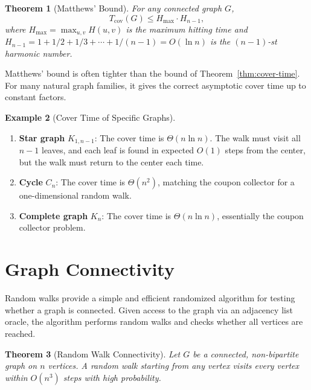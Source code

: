 \documentclass[twoside,12pt]{book}
\theoremstyle{plain}
\newtheorem{theorem}{Theorem}[chapter]
\theoremstyle{definition}
\newtheorem{example}[theorem]{Example}
\theoremstyle{remark}
\begin{document}
\begin{theorem}[Matthews' Bound]\label{thm:matthews}
For any connected graph $G$,
\[
    T_{\mathrm{cov}}(G) \leq H_{\max} \cdot H_{n-1},
\]
where $H_{\max} = \max_{u,v} H(u,v)$ is the maximum hitting time and
$H_{n-1} = 1 + 1/2 + 1/3 + \cdots + 1/(n-1) = O(\ln n)$ is the
$(n-1)$-st harmonic number.
\end{theorem}

Matthews' bound is often tighter than the bound of
Theorem~\ref{thm:cover-time}. For many natural graph families, it gives
the correct asymptotic cover time up to constant factors.

\begin{example}[Cover Time of Specific Graphs]\label{ex:cover-times}
\begin{enumerate}[label=(\roman*)]
\item \textbf{Star graph} $K_{1,n-1}$: The cover time is
    $\Theta(n \ln n)$. The walk must visit all $n-1$ leaves, and each
    leaf is found in expected $O(1)$ steps from the center, but the
    walk must return to the center each time.
\item \textbf{Cycle} $C_n$: The cover time is $\Theta(n^2)$, matching
    the coupon collector for a one-dimensional random walk.
\item \textbf{Complete graph} $K_n$: The cover time is
    $\Theta(n \ln n)$, essentially the coupon collector problem.
\end{enumerate}
\end{example}

\section{Graph Connectivity}
\label{sec:connectivity}

Random walks provide a simple and efficient randomized algorithm for
testing whether a graph is connected. Given access to the graph via an
adjacency list oracle, the algorithm performs random walks and checks
whether all vertices are reached.

\begin{theorem}[Random Walk Connectivity]\label{thm:rw-connectivity}
Let $G$ be a connected, non-bipartite graph on $n$ vertices. A random
walk starting from any vertex visits every vertex within $O(n^3)$ steps
with high probability.
\end{theorem}
\end{document}
